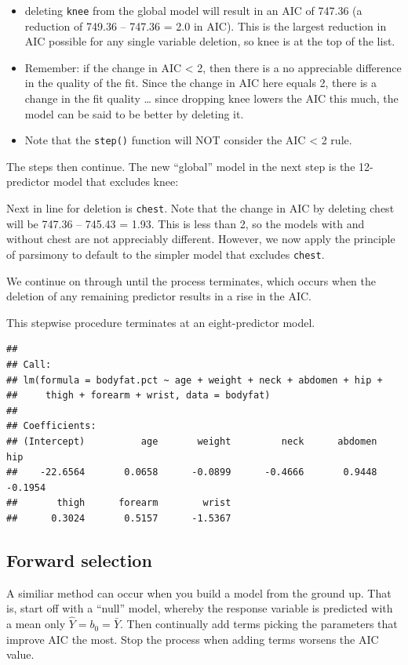 \documentclass[
]{book}
\providecommand{\tightlist}{%
  \setlength{\itemsep}{0pt}\setlength{\parskip}{0pt}}
\begin{document}
\begin{itemize}
\tightlist
\item
  deleting \texttt{knee} from the global model will result in an AIC of 747.36 (a reduction of 749.36 -- 747.36 = 2.0 in AIC). This is the largest reduction in AIC possible for any single variable deletion, so knee is at the top of the list.
\item
  Remember: if the change in AIC \textless{} 2, then there is a no appreciable difference in the quality of the fit. Since the change in AIC here equals 2, there is a change in the fit quality \ldots{} since dropping knee lowers the AIC this much, the model can be said to be better by deleting it.
\item
  Note that the \texttt{step()} function will NOT consider the AIC \textless{} 2 rule.
\end{itemize}

The steps then continue. The new ``global'' model in the next step is the 12-predictor model that excludes knee:

Next in line for deletion is \texttt{chest}. Note that the change in AIC by deleting chest will be 747.36 -- 745.43 = 1.93. This is less than 2, so the models with and without chest are not appreciably different. However, we now apply the principle of parsimony to default to the simpler model that excludes \texttt{chest}.

We continue on through until the process terminates, which occurs when the deletion of any remaining predictor results in a rise in the AIC.

This stepwise procedure terminates at an eight-predictor model.

\begin{verbatim}
## 
## Call:
## lm(formula = bodyfat.pct ~ age + weight + neck + abdomen + hip + 
##     thigh + forearm + wrist, data = bodyfat)
## 
## Coefficients:
## (Intercept)          age       weight         neck      abdomen          hip  
##    -22.6564       0.0658      -0.0899      -0.4666       0.9448      -0.1954  
##       thigh      forearm        wrist  
##      0.3024       0.5157      -1.5367
\end{verbatim}

\hypertarget{forward-selection}{%
\subsection{Forward selection}\label{forward-selection}}

A similiar method can occur when you build a model from the ground up. That is, start off with a ``null'' model, whereby the response variable is predicted with a mean only \(\hat{Y} = b_0 = \bar{Y}\). Then continually add terms picking the parameters that improve AIC the most. Stop the process when adding terms worsens the AIC value.
\end{document}
